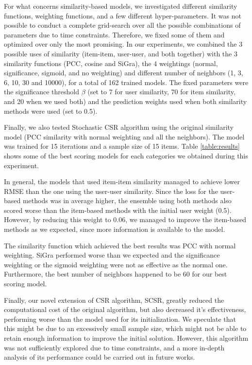 \documentclass[sigconf]{acmart}
\begin{document}
% 

For what concerns similarity-based models, we investigated different similarity functions, weighting functions, and a few different hyper-parameters. 
It was not possible to conduct a complete grid-search over all the possible combinations of parameters due to time constraints. 
Therefore, we fixed some of them and optimized over only the most promising.
In our experiments, we combined the 3 possible uses of similarity (item-item, user-user, and both together) with the 3 similarity functions (PCC, cosine and SiGra), the 4 weightings (normal, significance, sigmoid, and no weighting) and different number of neighbors (1, 3, 6, 10, 30 and 10000), for a total of 162 trained models.
The fixed parameters were the significance threshold $\beta$ (set to 7 for user similarity, 70 for item similarity, and 20 when we used both) and the prediction weights used when both similarity methods were used (set to 0.5). 

Finally, we also tested Stochastic CSR algorithm using the original similarity model (PCC similarity with normal weighting and all the neighbors). The model was trained for 15 iterations and a sample size of 15 items.
Table \ref{table:results} shows some of the best scoring models for each categories we obtained during this experiment.

In general, the models that used item-item similarity managed to achieve lower RMSE than the one using the user-user similarity. 
Since the loss for the user-based methods was in average higher, the ensemble using both methods also scored worse than the item-based methods with the initial user weight (0.5). However, by reducing this weight to 0.06, we managed to improve the item-based methods as we expected, since more information is available to the model.

The similarity function which achieved the best results was PCC with normal weighting. SiGra performed worse than we expected and the significance weighting or the sigmoid weighting were not as effective as the normal one. Furthermore, the best number of neighbors happened to be 60 for our best scoring model.

Finally, our novel extension of CSR algorithm, SCSR, greatly reduced the computational cost of the original algorithm, but also decreased it's effectiveness, performing worse than the model used for its initialization. We speculate that this might be due to an excessively small sample size, which might not be able to retain enough information to improve the initial solution. 
However, this algorithm was not sufficiently explored due to time constraints, and a more in-depth analysis of its performance could be carried out in future works. 
\end{document}
